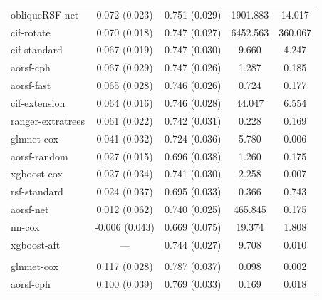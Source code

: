 \documentclass{article}\usepackage[]{graphicx}\usepackage[]{xcolor}
\newenvironment{knitrout}{}{} %
\begin{document}
\begin{knitrout}
\begin{longtable}[t]{lcccc}
\hline
\hspace{1em}obliqueRSF-net & 0.072 (0.023) & 0.751 (0.029) & 1901.883 & 14.017\\
\hspace{1em}cif-rotate & 0.070 (0.018) & 0.747 (0.027) & 6452.563 & 360.067\\
\hspace{1em}cif-standard & 0.067 (0.019) & 0.747 (0.030) & 9.660 & 4.247\\
\hspace{1em}aorsf-cph & 0.067 (0.029) & 0.747 (0.026) & 1.287 & 0.185\\
\hspace{1em}aorsf-fast & 0.065 (0.028) & 0.746 (0.026) & 0.724 & 0.177\\
\hspace{1em}cif-extension & 0.064 (0.016) & 0.746 (0.028) & 44.047 & 6.554\\
\hspace{1em}ranger-extratrees & 0.061 (0.022) & 0.742 (0.031) & 0.228 & 0.169\\
\hspace{1em}glmnet-cox & 0.041 (0.032) & 0.724 (0.036) & 5.780 & 0.006\\
\hspace{1em}aorsf-random & 0.027 (0.015) & 0.696 (0.038) & 1.260 & 0.175\\
\hspace{1em}xgboost-cox & 0.027 (0.034) & 0.741 (0.030) & 2.258 & 0.007\\
\hspace{1em}rsf-standard & 0.024 (0.037) & 0.695 (0.033) & 0.366 & 0.743\\
\hspace{1em}aorsf-net & 0.012 (0.062) & 0.740 (0.025) & 465.845 & 0.175\\
\hspace{1em}nn-cox & -0.006 (0.043) & 0.669 (0.075) & 19.374 & 1.808\\
\hspace{1em}xgboost-aft & --- & 0.744 (0.027) & 9.708 & 0.010\\
\addlinespace[0.3em]
\multicolumn{5}{l}{\textit{\textbf{FCL; death, n = 541, p = 7}}}\\
\hline
\hspace{1em}glmnet-cox & 0.117 (0.028) & 0.787 (0.037) & 0.098 & 0.002\\
\hspace{1em}aorsf-cph & 0.100 (0.039) & 0.769 (0.033) & 0.169 & 0.018\\

\end{longtable}
\end{knitrout}
\end{document}
